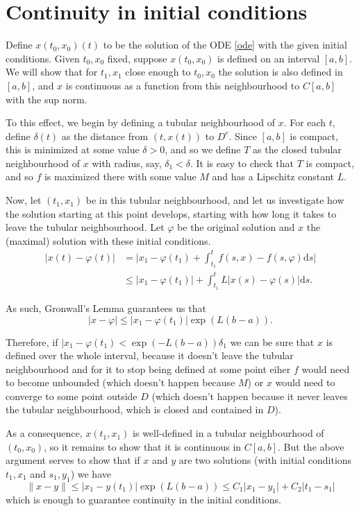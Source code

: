 \documentclass{article}
\newcommand{\dd}{\mathrm{d}}
\begin{document}
\section{Continuity in initial conditions}

Define $x(t_0, x_0)(t)$ to be the solution of the ODE \eqref{ode} with the given initial conditions. Given $t_0, x_0$ fixed, suppose $x(t_0, x_0)$ is defined on an interval $[a,b]$. We will show that for $t_1, x_1$ close enough to $t_0, x_0$ the solution is also defined in $[a,b]$, and $x$ is continuous as a function from this neighbourhood to $C[a,b]$ with the sup norm.

To this effect, we begin by defining a tubular neighbourhood of $x$. For each $t$, define $\delta(t)$ as the distance from $(t,x(t))$ to $D^c$. Since $[a,b]$ is compact, this is minimized at some value $ \delta > 0$, and so we define $T$ as the closed tubular neighbourhood of $x$ with radius, say, $\delta_1 < \delta$. It is easy to check that $T$ is compact, and so $f$ is maximized there with some value $M$ and has a Lipschitz constant $L$.

Now, let $(t_1, x_1)$ be in this tubular neighbourhood, and let us investigate how the solution starting at this point develops, starting with how long it takes to leave the tubular neighbourhood. Let $\varphi$ be the original solution and $x$ the (maximal) solution with these initial conditions.
\begin{align*}
\lvert x(t) - \varphi(t) \rvert &= \lvert x_1 - \varphi(t_1) + \int_{t_1}^t f(s, x) - f(s, \varphi) \dd s \rvert\\
&\leq \lvert x_1 - \varphi(t_1) \rvert + \int_{t_1}^t L \lvert x(s) - \varphi(s) \rvert \dd s.
\end{align*}

As such, Gronwall's Lemma guarantees us that
\[\lvert x - \varphi \rvert \leq \lvert x_1 - \varphi(t_1) \rvert \exp(L(b-a)).\]

Therefore, if $\lvert x_1 - \varphi(t_1) < \exp(-L(b-a)) \delta_1$ we can be sure that $x$ is defined over the whole interval, because it doesn't leave the tubular neighbourhood and for it to stop being defined at some point eiher $f$ would need to become unbounded (which doesn't happen because $M$) or $x$ would need to converge to some point outside $D$ (which doesn't happen because it never leaves the tubular neighbourhood, which is closed and contained in $D$).

As a consequence, $x(t_1, x_1)$ is well-defined in a tubular neighbourhood of $(t_0, x_0)$, so it remains to show that it is continuous in $C[a,b]$. But the above argument serves to show that if $x$ and $y$ are two solutions (with initial conditions $t_1, x_1$ and $s_1, y_1$) we have
\begin{equation}\label{uniformcontinuity}
\lVert x - y \rVert \leq \lvert x_1 - y(t_1) \rvert \exp(L(b-a)) \leq C_1 \lvert x_1 - y_1 \rvert + C_2 \lvert t_1 - s_1 \rvert
\end{equation}
which is enough to guarantee continuity in the initial conditions.
\end{document}
